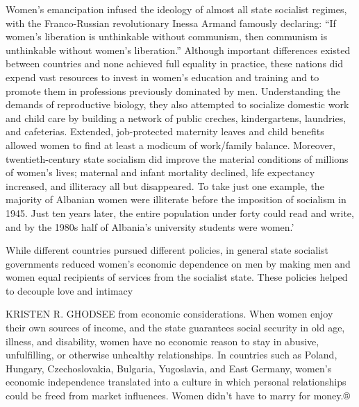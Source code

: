 Women’s emancipation infused the ideology of almost all state socialist regimes, with the Franco-Russian revolutionary Inessa Armand famously declaring: “If women’s liberation is unthinkable without communism, then communism is unthinkable without women’s liberation.” Although important differences existed between countries and none achieved full equality in practice, these nations did expend vast resources to invest in women’s education and training and to promote them in professions previously dominated by men. Understanding the demands of reproductive biology, they also attempted to socialize domestic work and child care by building a network of public creches, kindergartens, laundries, and cafeterias. Extended, job-protected maternity leaves and child benefits allowed women to find at least a modicum of work/family balance. Moreover, twentieth-century state socialism did improve the material conditions of millions of women’s lives; maternal and infant mortality declined, life expectancy increased, and illiteracy all but disappeared. To take just one example, the majority of Albanian women were illiterate before the imposition of socialism in 1945. Just ten years later, the entire population under forty could read and write, and by the 1980s half of Albania’s university students were women.’
 \par 
While different countries pursued different policies, in general state socialist governments reduced women’s economic dependence on men by making men and women equal recipients of services from the socialist state. These policies helped to decouple love and intimacy
 \par 
KRISTEN R. GHODSEE from economic considerations. When women enjoy their own sources of income, and the state guarantees social security in old age, illness, and disability, women have no economic reason to stay in abusive, unfulfilling, or otherwise unhealthy relationships. In countries such as Poland, Hungary, Czechoslovakia, Bulgaria, Yugoslavia, and East Germany, women’s economic independence translated into a culture in which personal relationships could be freed from market influences. Women didn’t have to marry for money.®
 \par 
